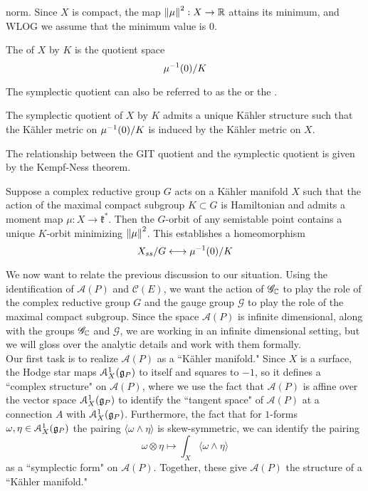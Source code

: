 norm. Since $X$ is compact, the map $\left\lVert\mu\right\rVert^2 : X \to \mathbb{R}$ attains
its minimum, and WLOG we assume that the minimum value is $0$.
%
\begin{defn}
The  of $X$ by $K$ is the quotient space
\[
\mu^{-1}(0)/K
\]
\end{defn}
%
The symplectic quotient can also be referred to as the 
or the .
%
\begin{thm}
The symplectic quotient of $X$ by $K$ admits a unique K\"ahler structure
such that the K\"ahler metric on $\mu^{-1}(0)/K$ is induced by the K\"ahler
metric on $X$.
\end{thm}
%
The relationship between the GIT quotient and the symplectic quotient is
given by the Kempf-Ness theorem.
%
\begin{thm}
Suppose a complex reductive group $G$ acts on a K\"ahler manifold $X$
such that the action of the maximal compact subgroup $K \subset G$ is
Hamiltonian and admits a moment map $\mu : X \to \mathfrak{k}^*$. Then
the $G$-orbit of any semistable point contains a unique $K$-orbit minimizing
$\left\lVert\mu\right\rVert^2$. This establishes a homeomorphism
\[
X_{ss}/G \longleftrightarrow \mu^{-1}(0)/K
\]
\end{thm}
%
We now want to relate the previous discussion to our situation. Using
the identification of $\mathscr{A}(P)$ and $\mathscr{C}(E)$, we
want the action of $\mathscr{G}_{\mathbb{C}}$ to play the role of the complex reductive
group $G$ and the gauge group $\mathscr{G}$ to play the role of the maximal
compact subgroup. Since the space $\mathscr{A}(P)$ is infinite dimensional,
along with the groups $\mathscr{G}_{\mathbb{C}}$ and $\mathscr{G}$, we are working
in an infinite dimensional setting, but we will gloss over the analytic
details and work with them formally. \\

Our first task is to realize $\mathscr{A}(P)$ as a ``K\"ahler manifold."
Since $X$ is a surface, the Hodge star maps $\mathcal{A}^1_X(\mathfrak{g}_P)$ to
itself and squares to $-1$, so it defines a ``complex structure" on
$\mathscr{A}(P)$, where we use the fact that $\mathscr{A}(P)$ is affine
over the vector space $\mathcal{A}^1_X(\mathfrak{g}_P)$ to identify the ``tangent space"
of $\mathscr{A}(P)$ at a connection $A$ with $\mathcal{A}^1_X(\mathfrak{g}_P)$.
Furthermore, the fact that for $1$-forms $\omega,\eta \in \mathcal{A}^1_X(\mathfrak{g}_P)$
the pairing $\langle\omega\wedge\eta\rangle$ is skew-symmetric, we
can identify the pairing
\[
\omega \otimes \eta \mapsto \int_X \langle\omega\wedge\eta\rangle
\]
as a ``symplectic form" on $\mathscr{A}(P)$. Together, these give
$\mathscr{A}(P)$ the structure of a ``K\"ahler manifold." \\

